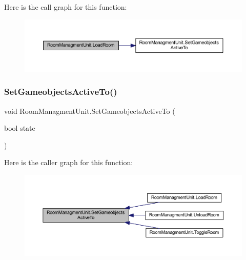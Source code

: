 Here is the call graph for this function\+:
\nopagebreak
\begin{figure}[H]
\begin{center}
\leavevmode
\includegraphics[width=350pt]{class_room_managment_unit_a7f34dfb62166ebcbd2a314f0bcdb61e9_cgraph}
\end{center}
\end{figure}
\mbox{\label{class_room_managment_unit_ae39467cac522f23c198693c215968ad7}} 
\subsubsection{\texorpdfstring{Set\+Gameobjects\+Active\+To()}{SetGameobjectsActiveTo()}}
{\footnotesize\ttfamily void Room\+Managment\+Unit.\+Set\+Gameobjects\+Active\+To (\begin{DoxyParamCaption}\item[{bool}]{state }\end{DoxyParamCaption})\hspace{0.3cm}{\ttfamily [private]}}

Here is the caller graph for this function\+:
\nopagebreak
\begin{figure}[H]
\begin{center}
\leavevmode
\includegraphics[width=350pt]{class_room_managment_unit_ae39467cac522f23c198693c215968ad7_icgraph}
\end{center}
\end{figure}
\mbox{\label{class_room_managment_unit_a6043074719f8d67150cbfcff4c7a4cec}} 
